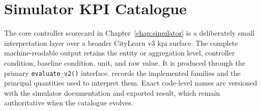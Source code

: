 \section{Simulator KPI Catalogue}
\label{app:sim-kpi-catalogue}

The core controller scorecard in Chapter~\ref{chap:simulator} is a deliberately small interpretation layer over a broader CityLearn v3 \gls{kpi} surface. The complete machine-readable output retains the entity or aggregation level, controller condition, baseline condition, unit, and raw value. It is produced through the primary \texttt{evaluate\_v2()} interface.  records the implemented families and the principal quantities used to interpret them. Exact code-level names are versioned with the simulator documentation and exported result, which remain authoritative when the catalogue evolves.


